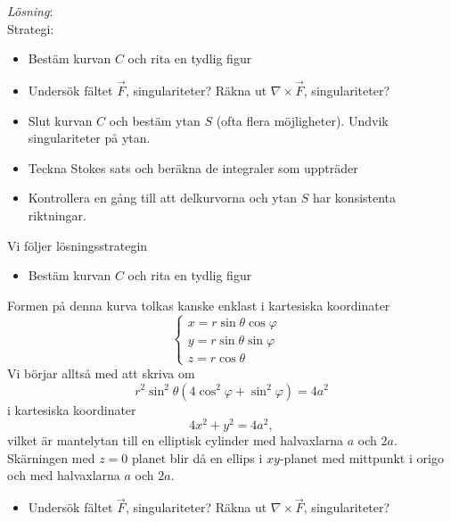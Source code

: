 \documentclass[%
oneside,                 %
final,                   %
10pt]{article}
\begin{document}
\emph{Lösning}:   \\
Strategi:
\begin{itemize}
\item Bestäm kurvan $C$ och rita en tydlig figur

\item Undersök fältet $\vec{F}$, singulariteter? Räkna ut $\nabla \times \vec{F}$, singulariteter?

\item Slut kurvan $C$ och bestäm ytan $S$ (ofta flera möjligheter). Undvik singulariteter på ytan.

\item Teckna Stokes sats och beräkna de integraler som uppträder

\item Kontrollera en gång till att delkurvorna och ytan $S$ har konsistenta riktningar.
\end{itemize}

\noindent
Vi följer lösningsstrategin
\begin{itemize}
\item Bestäm kurvan $C$ och rita en tydlig figur
\end{itemize}

\noindent
Formen på denna kurva tolkas kanske enklast i kartesiska koordinater
\begin{equation}
\left\{
\begin{array}{ll}
x = r \sin\theta \cos\varphi & \\
y = r \sin\theta \sin\varphi & \\
z = r\cos\theta
\end{array}
\right.
\end{equation}
Vi börjar alltså med att skriva om 
\begin{equation}
  r^2 \sin^2 \theta \left(4 \cos^2 \varphi + \sin^2 \varphi\right) = 4 a^2
\end{equation}
i kartesiska koordinater
\begin{equation}
  4x^2 + y^2 = 4a^2,
\end{equation}
vilket är mantelytan till en elliptisk cylinder med halvaxlarna $a$ och $2a$. Skärningen med $z=0$ planet blir då en ellips i $xy$-planet med mittpunkt i origo och med halvaxlarna $a$ och $2a$.
\begin{itemize}
\item Undersök fältet $\vec{F}$, singulariteter? Räkna ut $\nabla \times \vec{F}$, singulariteter?
\end{itemize}
\end{document}
